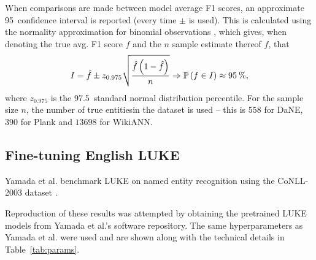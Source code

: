 \documentclass[main.tex]{subfiles}
\begin{document}
When comparisons are made between model average F1 scores, an approximate 95\pro\ confidence interval is reported (every time $\pm$ is used).
This is calculated using the normality approximation for binomial observations \cite[Method 7.3]{brockhoff2018stat}, which gives, when denoting the true avg. F1 score $f$ and the $n$ sample estimate thereof $\hat f$, that
\begin{equation}
    \label{eq:ci}
    I = \hat f \pm z_{0.975}
    \sqrt{
        \frac
        {\hat f\left(1-\hat f\right)}
        {n}
    }
    \Rightarrow
    \mathbb P\left(
        f \in I
    \right)
    \approx 95\:\text{\%{}},
\end{equation}
where $z_{0.975}$ is the 97.5\pro\ standard normal distribution percentile.
For the sample size $n$, the number of true entities\footnotemark in the dataset is used -- this is $558$ for DaNE, $390$ for Plank and $13698$ for WikiANN.

\subsection{Fine-tuning English LUKE}
Yamada et al. benchmark LUKE on named entity recognition using the CoNLL-2003 dataset \cite{yamada2020luke}.

Reproduction of these results was attempted by obtaining the pretrained LUKE models from Yamada et al.'s software repository.
The same hyperparameters as Yamada et al. were used and are shown along with the technical details in Table~\ref{tab:params}.
\end{document}
